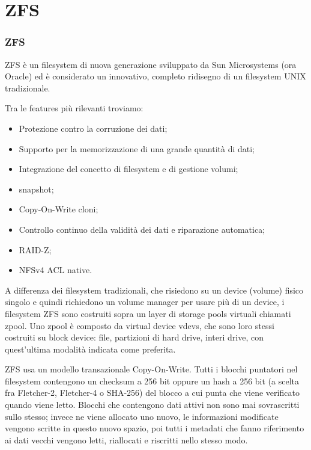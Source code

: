 \documentclass{beamer}
\begin{document}
\section{ZFS}
\begin{frame}
\frametitle{ZFS}
ZFS \`e un filesystem di nuova generazione sviluppato da Sun Microsystems (ora Oracle) ed \`e considerato un innovativo, completo ridisegno di un filesystem UNIX tradizionale. 
\end{frame}

\begin{frame}
Tra le features pi\`u rilevanti troviamo:
\begin{itemize}
\item Protezione contro la corruzione dei dati;
\item Supporto per la memorizzazione di una grande quantit\`a di dati;
\item Integrazione del concetto di filesystem e di gestione volumi;
\item snapshot;
\item Copy-On-Write cloni;
\item Controllo continuo della validit\`a dei dati e riparazione automatica;
\item RAID-Z;
\item NFSv4 ACL native.
\end{itemize}
\end{frame}

\begin{frame}
A differenza dei filesystem tradizionali, che risiedono su un device (volume) fisico singolo e quindi richiedono un volume manager per usare pi\`u di un device, i filesystem ZFS sono costruiti sopra un layer di storage pools virtuali chiamati zpool. 
\newline
Uno zpool \`e composto da virtual device vdevs, che sono loro stessi costruiti su block device: file, partizioni di hard drive, interi drive, con quest'ultima modalit\`a indicata come preferita.
\end{frame}

\begin{frame}
ZFS usa un modello transazionale Copy-On-Write. Tutti i blocchi puntatori nel filesystem contengono un checksum a 256 bit oppure un hash a 256 bit (a scelta fra Fletcher-2, Fletcher-4 o SHA-256) del blocco a cui punta che viene verificato quando viene letto. Blocchi che contengono dati attivi non sono mai sovrascritti sullo stesso; invece ne viene allocato uno nuovo, le informazioni modificate vengono scritte in questo nuovo spazio, poi tutti i metadati che fanno riferimento ai dati vecchi vengono letti, riallocati e riscritti nello stesso modo. 
\end{frame}
\end{document}

